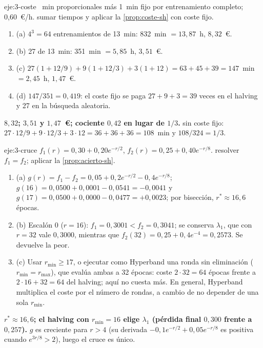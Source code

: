\begin{solucion}{eje:3-coste}
~min proporcionales más 1~min fijo por entrenamiento completo; 0{,}60~€/h.
\planteamiento sumar tiempos y aplicar la \cref{prop:coste-sh} con coste fijo.
\pasos
\begin{enumerate}[label=\arabic*.]
  \item (a) $4^{3}=64$ entrenamientos de 13~min: 832~min $=13{,}87$~h, $8{,}32$~€.
  \item (b) 27 de 13~min: 351~min $=5{,}85$~h, $3{,}51$~€.
  \item (c) $27(1+12/9)+9(1+12/3)+3(1+12)=63+45+39=147$~min $=2{,}45$~h, $1{,}47$~€.
  \item (d) $147/351=0{,}419$: el coste fijo se paga $27+9+3=39$ veces en el halving y 27 en la búsqueda aleatoria.
\end{enumerate}
\resultado \textbf{$8{,}32$; $3{,}51$ y $1{,}47$~€; cociente $0{,}42$ en lugar de $1/3$.}
\comprobacion sin coste fijo: $27\cdot12/9+9\cdot12/3+3\cdot12=36+36+36=108$~min y $108/324=1/3$.
\end{solucion}

\begin{solucion}{eje:3-cruce}
\datos $f_1(r)=0{,}30+0{,}20e^{-r/2}$, $f_2(r)=0{,}25+0{,}40e^{-r/8}$.
\planteamiento resolver $f_1=f_2$; aplicar la \cref{prop:acierto-sh}.
\pasos
\begin{enumerate}[label=\arabic*.]
  \item (a) $g(r)=f_1-f_2=0{,}05+0{,}2e^{-r/2}-0{,}4e^{-r/8}$; $g(16)=0{,}0500+0{,}0001-0{,}0541=-0{,}0041$ y $g(17)=0{,}0500+0{,}0000-0{,}0477=+0{,}0023$; por bisección, $r^{*}\approx16{,}6$ épocas.
  \item (b) Escalón 0 ($r=16$): $f_1=0{,}3001<f_2=0{,}3041$; se conserva $\lambda_1$, que con $r=32$ vale $0{,}3000$, mientras que $f_2(32)=0{,}25+0{,}4e^{-4}=0{,}2573$. Se devuelve la peor.
  \item (c) Usar $r_{\min}\ge17$, o ejecutar como Hyperband una ronda sin eliminación ($r_{\min}=r_{\max}$), que evalúa ambas a 32 épocas: coste $2\cdot32=64$ épocas frente a $2\cdot16+32=64$ del halving; aquí no cuesta más. En general, Hyperband multiplica el coste por el número de rondas, a cambio de no depender de una sola $r_{\min}$.
\end{enumerate}
\resultado \textbf{$r^{*}\approx16{,}6$; el halving con $r_{\min}=16$ elige $\lambda_1$ (pérdida final $0{,}300$ frente a $0{,}257$).}
\comprobacion $g$ es creciente para $r>4$ (su derivada $-0{,}1e^{-r/2}+0{,}05e^{-r/8}$ es positiva cuando $e^{3r/8}>2$), luego el cruce es único.
\end{solucion}

